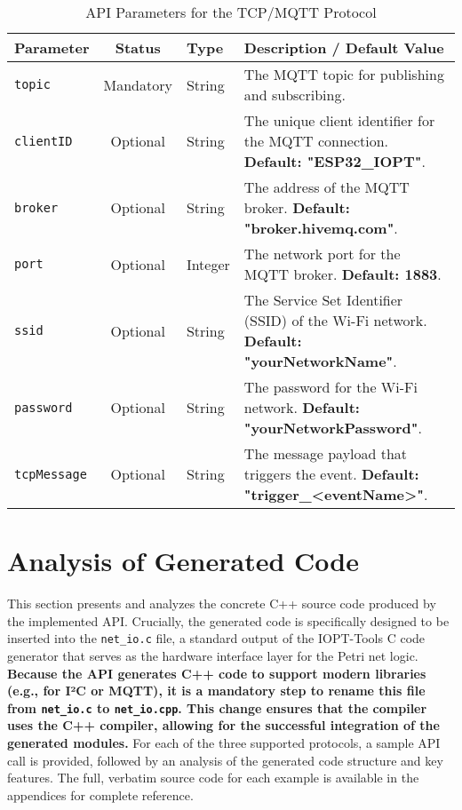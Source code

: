 \begin{table}[h!]
    \centering
    \caption{API Parameters for the TCP/MQTT Protocol}
    \label{tab:tcp_params}
    \begin{tabular}{|l|c|l|p{6cm}|}
        \hline
        \textbf{Parameter} & \textbf{Status} & \textbf{Type} & \textbf{Description / Default Value} \\ \hline
        \texttt{topic} & Mandatory & String & The MQTT topic for publishing and subscribing. \\ \hline
        \texttt{clientID} & Optional & String & The unique client identifier for the MQTT connection. \textbf{Default: "ESP32\_IOPT"}. \\ \hline
        \texttt{broker} & Optional & String & The address of the MQTT broker. \textbf{Default: "broker.hivemq.com"}. \\ \hline
        \texttt{port} & Optional & Integer & The network port for the MQTT broker. \textbf{Default: 1883}. \\ \hline
        \texttt{ssid} & Optional & String & The Service Set Identifier (SSID) of the Wi-Fi network. \textbf{Default: "yourNetworkName"}. \\ \hline
        \texttt{password} & Optional & String & The password for the Wi-Fi network. \textbf{Default: "yourNetworkPassword"}. \\ \hline
        \texttt{tcpMessage} & Optional & String & The message payload that triggers the event. \textbf{Default: "trigger\_<eventName>"}. \\ \hline
    \end{tabular}
\end{table}



\section{Analysis of Generated Code}
\label{sec:code_analysis}

This section presents and analyzes the concrete C++ source code produced by the implemented API. Crucially, the generated code is specifically designed to be inserted into the \texttt{net\_io.c} file, a standard output of the IOPT-Tools C code generator that serves as the hardware interface layer for the Petri net logic. \textbf{Because the API generates C++ code to support modern libraries (e.g., for I²C or MQTT), it is a mandatory step to rename this file from \texttt{net\_io.c} to \texttt{net\_io.cpp}. This change ensures that the compiler uses the C++ compiler, allowing for the successful integration of the generated modules.} For each of the three supported protocols, a sample API call is provided, followed by an analysis of the generated code structure and key features. The full, verbatim source code for each example is available in the appendices for complete reference.

